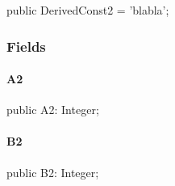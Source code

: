 \documentclass{report}
\begin{document}
\begin{list}{}{
\setlength{\itemindent}{0cm}
\setlength{\listparindent}{0cm}
\setlength{\leftmargin}{\evensidemargin}
\addtolength{\leftmargin}{\tmplength}
\settowidth{\labelsep}{X}
\addtolength{\leftmargin}{\labelsep}
\setlength{\labelwidth}{\tmplength}
}
\begin{flushleft}
\item[\textbf{Declaration}\hfill]
\begin{ttfamily}
public DerivedConst2 = 'blabla';\end{ttfamily}


\end{flushleft}
\end{list}
\subsubsection*{\large{\textbf{Fields}}\normalsize\hspace{1ex}\hfill}
\paragraph*{A2}\hspace*{\fill}

\begin{list}{}{
\setlength{\itemindent}{0cm}
\setlength{\listparindent}{0cm}
\setlength{\leftmargin}{\evensidemargin}
\addtolength{\leftmargin}{\tmplength}
\settowidth{\labelsep}{X}
\addtolength{\leftmargin}{\labelsep}
\setlength{\labelwidth}{\tmplength}
}
\begin{flushleft}
\item[\textbf{Declaration}\hfill]
\begin{ttfamily}
public A2: Integer;\end{ttfamily}


\end{flushleft}
\end{list}
\paragraph*{B2}\hspace*{\fill}

\begin{list}{}{
\setlength{\itemindent}{0cm}
\setlength{\listparindent}{0cm}
\setlength{\leftmargin}{\evensidemargin}
\addtolength{\leftmargin}{\tmplength}
\settowidth{\labelsep}{X}
\addtolength{\leftmargin}{\labelsep}
\setlength{\labelwidth}{\tmplength}
}
\begin{flushleft}
\item[\textbf{Declaration}\hfill]
\begin{ttfamily}
public B2: Integer;\end{ttfamily}


\end{flushleft}
\end{list}
\end{document}
